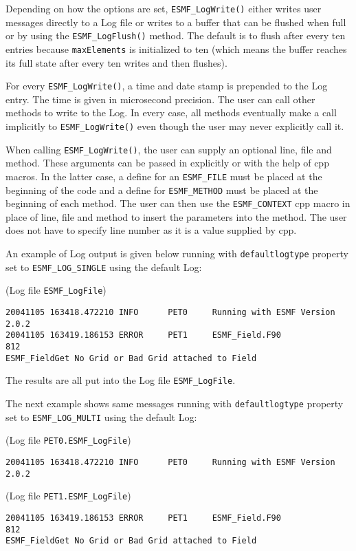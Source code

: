 Depending on how the options are set, {\tt ESMF\_LogWrite()} either writes user
messages directly to a Log file or writes to a buffer that can be flushed when 
full or by using the {\tt ESMF\_LogFlush()} method.  The default is to flush 
after every ten entries because {\tt maxElements} is initialized to ten 
(which means the buffer reaches its full state after every ten writes and then
flushes).

For every {\tt ESMF\_LogWrite()}, a time and date stamp is prepended to the
Log entry.  The time is given in microsecond precision.  The user can call 
other methods to write to the Log.  In every case, all methods eventually make 
a call implicitly to {\tt ESMF\_LogWrite()} even though the user may never 
explicitly call it.

When calling {\tt ESMF\_LogWrite()}, the user can supply an optional line,
file and method.  These arguments can be passed in explicitly or with the help
of cpp macros.  In the latter case, a define for an {\tt ESMF\_FILE} must be 
placed at the beginning of the code and a define for {\tt ESMF\_METHOD} must
be placed at the beginning of each method.  The user can then use the
{\tt ESMF\_CONTEXT} cpp macro in place of line, file and method to insert the 
parameters into the method.  The user does not have to specify line number as
it is a value supplied by cpp.

An example of Log output is given below running with {\tt defaultlogtype} 
property set to {\tt ESMF\_LOG\_SINGLE} using the default Log:

(Log file {\tt ESMF\_LogFile})
\begin{verbatim}
20041105 163418.472210 INFO      PET0     Running with ESMF Version 2.0.2   
20041105 163419.186153 ERROR     PET1     ESMF_Field.F90             812  
ESMF_FieldGet No Grid or Bad Grid attached to Field
\end{verbatim}

The results are all put into the Log file {\tt ESMF\_LogFile}.

The next example shows same messages running with {\tt defaultlogtype} 
property set to {\tt ESMF\_LOG\_MULTI} using the default Log:

(Log file {\tt PET0.ESMF\_LogFile})
\begin{verbatim}
20041105 163418.472210 INFO      PET0     Running with ESMF Version 2.0.2   
\end{verbatim}

(Log file {\tt PET1.ESMF\_LogFile})
\begin{verbatim}
20041105 163419.186153 ERROR     PET1     ESMF_Field.F90             812  
ESMF_FieldGet No Grid or Bad Grid attached to Field
\end{verbatim}

